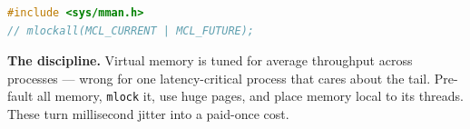 \begin{lstlisting}[language=C++, caption={mlockall pins memory resident, preventing major faults. Linux, privileged. Min standard: C++11.}]
#include <sys/mman.h>
// mlockall(MCL_CURRENT | MCL_FUTURE);
\end{lstlisting}

\textbf{The discipline.} Virtual memory is tuned for average throughput across processes --- wrong for one latency-critical process that cares about the tail. Pre-fault all memory, \texttt{mlock} it, use huge pages, and place memory local to its threads. These turn millisecond jitter into a paid-once cost.
